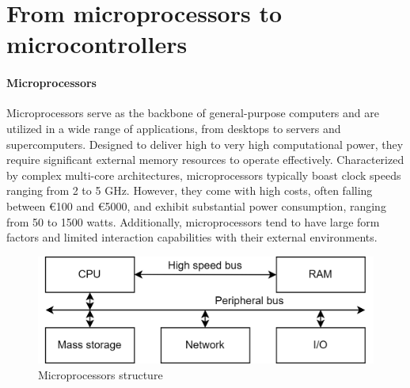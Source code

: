 \section{From microprocessors to microcontrollers}

\paragraph*{Microprocessors}
Microprocessors serve as the backbone of general-purpose computers and are utilized in a wide range of applications, from desktops to servers and supercomputers. 
Designed to deliver high to very high computational power, they require significant external memory resources to operate effectively. 
Characterized by complex multi-core architectures, microprocessors typically boast clock speeds ranging from 2 to 5 GHz. However, they come with high costs, often falling between €100 and €5000, and exhibit substantial power consumption, ranging from 50 to 1500 watts. 
Additionally, microprocessors tend to have large form factors and limited interaction capabilities with their external environments.
\begin{figure}[H]
    \centering
    \includegraphics[width=0.75\linewidth]{images/micpro.png}
    \caption{Microprocessors structure}
\end{figure}

